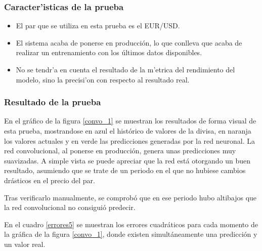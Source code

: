 \subsubsection*{Caracter'isticas de la prueba}
\begin{itemize}
\item El par que se utiliza en esta prueba es el EUR/USD.
\item El sistema acaba de ponerse en producción, lo que conlleva que acaba de realizar un entrenamiento con los últimos datos disponibles.
\item No se tendr'a en cuenta el resultado de la m'etrica del rendimiento del modelo, sino la precisi'on con respecto al resultado real.
\end{itemize}

\subsubsection*{Resultado de la prueba}

En el gráfico de la figura \ref{convo_1} se muestran los resultados de forma visual de esta prueba, mostrandose en azul el histórico de valores de la divisa, en naranja los valores actuales y en verde las predicciones generadas por la red neuronal. La red convolucional, al ponerse en producción, genera unas predicciones muy suavizadas. A simple vista se puede apreciar que la red está otorgando un buen resultado, asumiendo que se trate de un periodo en el que no hubiese cambios drásticos en el precio del par. 

Tras verificarlo manualmente, se comprobó que en ese periodo hubo altibajos que la red convolucional no consiguió predecir.

En el cuadro  \ref{errores5} se muestran los errores cuadráticos para cada momento de la gráfica de la figura \ref{convo_1}, donde existen simultáneamente una predicción y un valor real.


